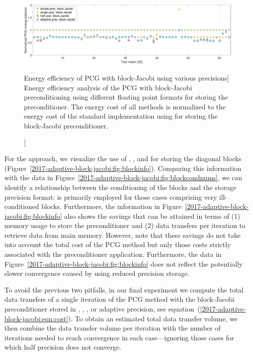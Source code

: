 \begin{figure}[t]
\begin{center}
\includegraphics[width=\textwidth]{plots/fcg_energy_rel_adapt}
\caption
[Energy efficiency of PCG with block-Jacobi using various precisions]
{Energy efficiency analysis of the PCG with block-Jacobi preconditioning
	using different floating point formats for storing the preconditioner. The
	energy cost of all methods is normalized to the energy cost of the standard
	implementation using \fpd for storing the block-Jacobi preconditioner.}
\label{2017-adaptive-block-jacobi:fig:energyanalysis}
\end{center}
\end{figure}

For the \apbj approach, we visualize  the use of \fpd, \fps, and \fph for 
storing the diagonal blocks (Figure~\ref{2017-adaptive-block-jacobi:fig:blockinfo}). Comparing this 
information
with the data in Figure~\ref{2017-adaptive-block-jacobi:fig:blockcondnums}, we can identify a relationship
between the conditioning of the blocks and the storage precision format: \fpd 
is primarily employed for those cases comprising very ill-conditioned
blocks. Furthermore, the information in Figure~\ref{2017-adaptive-block-jacobi:fig:blockinfo} also
shows the savings that can be attained in terms of (1) memory usage
to store the preconditioner and (2) data transfers per iteration to retrieve 
data from main memory. However, note that these savings do not take into
account the total cost of the PCG method but only those costs strictly 
associated
with the preconditioner application. 
Furthermore, the data in Figure~\ref{2017-adaptive-block-jacobi:fig:blockinfo} does not reflect the
potentially slower convergence caused by using reduced precision storage.

To avoid the previous two pitfalls, in our final experiment we compute the total
data transfers of a single iteration of the PCG method with the block-Jacobi
preconditioner stored in \fpd, \fps, \fph, or adaptive precision, 
see equation~(\ref{2017-adaptive-block-jacobi:eqn:cost}). To obtain an estimated total data transfer 
volume,
we then combine the data transfer volume per iteration with the number of
iterations needed to reach convergence in each case---ignoring those cases for
which half precision does not converge.

